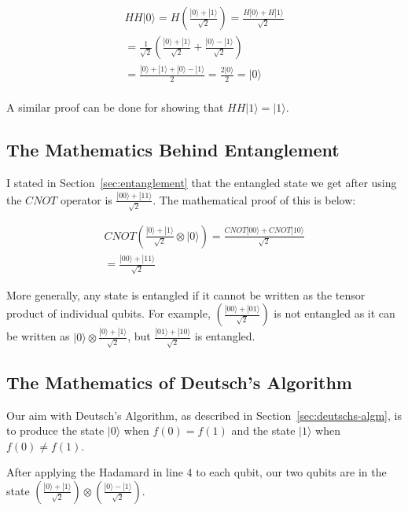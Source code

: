 \documentclass[twocolumn]{article}
\begin{document}
\begin{gather*}
    HH|0\rangle = H\left(\frac{|0\rangle + |1\rangle}{\sqrt{2}}\right) = \frac{H|0\rangle + H|1\rangle}{\sqrt{2}}\\
    = \frac{1}{\sqrt{2}}\left(\frac{|0\rangle + |1\rangle}{\sqrt{2}} + \frac{|0\rangle - |1\rangle}{\sqrt{2}}\right)\\
    = \frac{|0\rangle + |1\rangle + |0\rangle - |1\rangle}{2} = \frac{2|0\rangle}{2} = |0\rangle\\
\end{gather*}

A similar proof can be done for showing that $HH|1\rangle = |1\rangle$.

\subsection{The Mathematics Behind Entanglement}
\label{subsec:maths-entanglement}

I stated in Section~\ref{sec:entanglement} that the entangled state we get after using the $CNOT$ operator is $\frac{|00\rangle + |11\rangle}{\sqrt{2}}$. The mathematical proof of this is below:

\begin{gather*}
CNOT\left(\frac{|0\rangle + |1\rangle}{\sqrt{2}}\otimes |0\rangle\right) = \frac{CNOT|00\rangle + CNOT|10\rangle}{\sqrt{2}}\\
= \frac{|00\rangle + |11\rangle}{\sqrt{2}}
\end{gather*}

More generally, any state is entangled if it cannot be written as the tensor product of individual qubits. For example, $(\frac{|00\rangle + |01\rangle}{\sqrt{2}})$ is not entangled as it can be written as $|0\rangle \otimes \frac{|0\rangle + |1\rangle}{\sqrt{2}}$, but $\frac{|01\rangle + |10\rangle}{\sqrt{2}}$ is entangled.

\subsection{The Mathematics of Deutsch's Algorithm}
\label{subsec:maths-deutschs-algm}

Our aim with Deutsch's Algorithm, as described in Section~\ref{sec:deutschs-algm}, is to produce the state $|0\rangle$ when $f(0) = f(1)$ and the state $|1\rangle$ when $f(0) \neq f(1)$.

After applying the Hadamard in line $4$ to each qubit, our two qubits are in the state $\left(\frac{|0\rangle + |1\rangle}{\sqrt{2}}\right) \otimes \left(\frac{|0\rangle - |1\rangle}{\sqrt{2}}\right)$.
\end{document}
